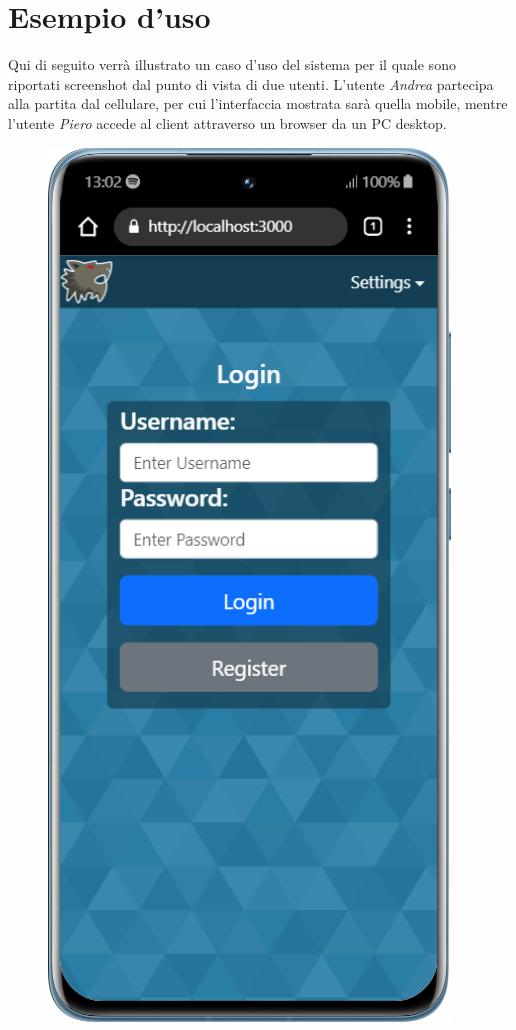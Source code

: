\section{Esempio d'uso}
Qui di seguito verrà illustrato un caso d'uso del sistema per il quale sono riportati screenshot dal punto di vista di due utenti. L'utente \emph{Andrea} partecipa alla partita dal cellulare, per cui l'interfaccia mostrata sarà quella mobile, mentre l'utente \emph{Piero} accede al client attraverso un browser da un PC desktop.




\begin{figure}[H]
    \centering
    \begin{minipage}{0.25\textwidth}
        \centering
        \includegraphics[width=0.95\textwidth]{img/screen/mobile/login_mobile.png}

\end{minipage}
\end{figure}
